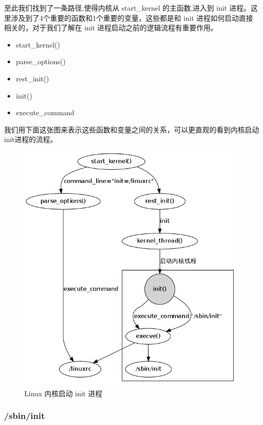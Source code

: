 至此我们找到了一条路径,使得内核从 start\_kernel 的主函数,进入到 init
进程。这里涉及到了4个重要的函数和1个重要的变量，这些都是和 init
进程如何启动直接相关的，对于我们了解在 init
进程启动之前的逻辑流程有重要作用。

\begin{itemize}
\item
  start\_kernel()
\item
  parse\_options()
\item
  rest\_init()
\item
  init()
\item
  execute\_command
\end{itemize}
我们用下面这张图来表示这些函数和变量之间的关系，可以更直观的看到内核启动init进程的流程。

\begin{figure}[htbp]
\centering
\includegraphics{./figures/kernel2init.png}
\caption{Linux 内核启动 init 进程}
\end{figure}

\subsubsection{/sbin/init}

